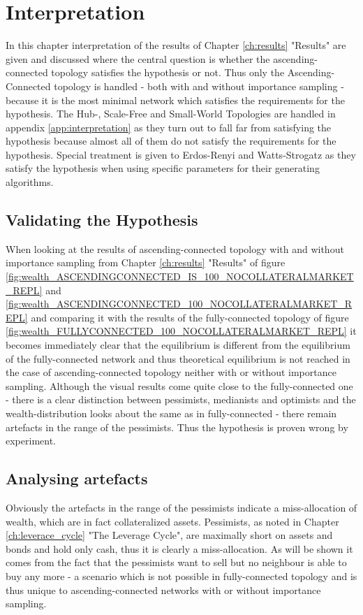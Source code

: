 \documentclass[Bachelorarbeit.tex]{subfiles}
\begin{document}
\graphicspath{{./figures/interpretation/}}	%

\chapter{Interpretation}
In this chapter interpretation of the results of Chapter \ref{ch:results} "Results" are given and discussed where the central question is whether the ascending-connected topology satisfies the hypothesis or not. Thus only the Ascending-Connected topology is handled - both with and without importance sampling - because it is the most minimal network which satisfies the requirements for the hypothesis. The Hub-, Scale-Free and Small-World Topologies are handled in appendix \ref{app:interpretation} as they turn out to fall far from satisfying the hypothesis because almost all of them do not satisfy the requirements for the hypothesis. Special treatment is given to Erdos-Renyi and Watts-Strogatz as they satisfy the hypothesis when using specific parameters for their generating algorithms.

\section{Validating the Hypothesis}
When looking at the results of ascending-connected topology with and without importance sampling from Chapter \ref{ch:results} "Results" of figure \ref{fig:wealth_ASCENDINGCONNECTED_IS_100_NOCOLLATERALMARKET_REPL} and \ref{fig:wealth_ASCENDINGCONNECTED_100_NOCOLLATERALMARKET_REPL} and comparing it with the results of the fully-connected topology of figure \ref{fig:wealth_FULLYCONNECTED_100_NOCOLLATERALMARKET_REPL} it becomes immediately clear that the equilibrium is different from the equilibrium of the fully-connected network and thus theoretical equilibrium is not reached in the case of ascending-connected topology neither with or without importance sampling. Although the visual results come quite close to the fully-connected one - there is a clear distinction between pessimists, medianists and optimists and the wealth-distribution looks about the same as in fully-connected - there remain artefacts in the range of the pessimists. Thus the hypothesis is proven wrong by experiment.

\section{Analysing artefacts}
Obviously the artefacts in the range of the pessimists indicate a miss-allocation of wealth, which are in fact collateralized assets. Pessimists, as noted in Chapter \ref{ch:leverace_cycle} "The Leverage Cycle", are maximally short on assets and bonds and hold only cash, thus it is clearly a miss-allocation. As will be shown it comes from the fact that the pessimists want to sell but no neighbour is able to buy any more - a scenario which is not possible in fully-connected topology and is thus unique to ascending-connected networks with or without importance sampling.
\end{document}
